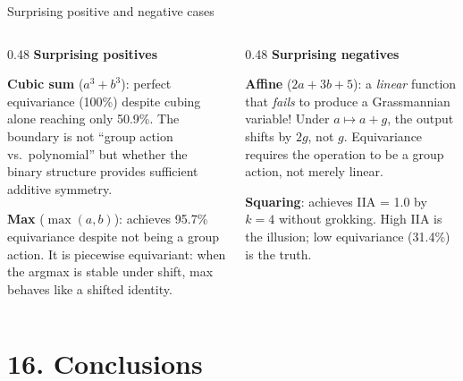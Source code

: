 \documentclass[aspectratio=169,11pt]{beamer}
\begin{document}
\begin{frame}{Surprising positive and negative cases}

\begin{columns}[T]
\begin{column}{0.48\textwidth}
\textbf{\textcolor{pass}{Surprising positives}}

\vspace{0.3em}
{\small \textbf{Cubic sum} ($a^3 + b^3$): perfect equivariance (100\%) despite cubing alone reaching only 50.9\%. The boundary is not ``group action vs.\ polynomial'' but whether the binary structure provides sufficient additive symmetry.}

\vspace{0.5em}
{\small \textbf{Max} ($\max(a,b)$): achieves 95.7\% equivariance despite not being a group action. It is piecewise equivariant: when the argmax is stable under shift, max behaves like a shifted identity.}
\end{column}
\begin{column}{0.48\textwidth}
\textbf{\textcolor{fail}{Surprising negatives}}

\vspace{0.3em}
{\small \textbf{Affine} ($2a + 3b + 5$): a \emph{linear} function that \emph{fails} to produce a Grassmannian variable! Under $a \mapsto a + g$, the output shifts by $2g$, not $g$. Equivariance requires the operation to be a group action, not merely linear.}

\vspace{0.5em}
{\small \textbf{Squaring}: achieves IIA = 1.0 by $k = 4$ without grokking. High IIA is the illusion; low equivariance (31.4\%) is the truth.}
\end{column}
\end{columns}
\end{frame}

\hypertarget{sec16}{}
\section{16. Conclusions}
\end{document}
